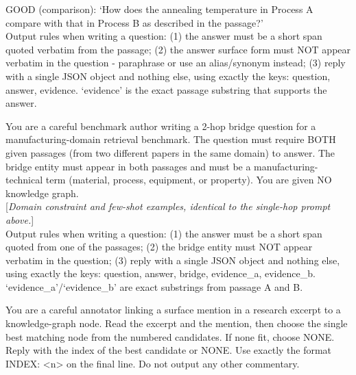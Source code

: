 \documentclass[11pt]{article}
\begin{document}
\begin{tcolorbox}[breakable, colback=gray!3, colframe=gray!55, colbacktitle=black!75, coltitle=white, boxrule=0.6pt, title=\textbf{Released-benchmark single-hop generator system prompt}, fonttitle=\small\bfseries]
\hspace*{1em}GOOD (comparison): `How does the annealing temperature in Process A compare with that in Process B as described in the passage?'\\[4pt]
Output rules when writing a question: (1) the answer must be a short span quoted verbatim from the passage; (2) the answer surface form must NOT appear verbatim in the question - paraphrase or use an alias/synonym instead; (3) reply with a single JSON object and nothing else, using exactly the keys: question, answer, evidence. `evidence' is the exact passage substring that supports the answer.
\end{tcolorbox}

\begin{tcolorbox}[breakable, colback=gray!3, colframe=gray!55, colbacktitle=black!75, coltitle=white, boxrule=0.6pt, title=\textbf{Released-benchmark two-hop bridge generator system prompt}, fonttitle=\small\bfseries]
\footnotesize\raggedright{}
You are a careful benchmark author writing a 2-hop bridge question for a manufacturing-domain retrieval benchmark. The question must require BOTH given passages (from two different papers in the same domain) to answer. The bridge entity must appear in both passages and must be a manufacturing-technical term (material, process, equipment, or property). You are given NO knowledge graph.\\[4pt]
[\textit{Domain constraint and few-shot examples, identical to the single-hop prompt above.}]\\[4pt]
Output rules when writing a question: (1) the answer must be a short span quoted from one of the passages; (2) the bridge entity must NOT appear verbatim in the question; (3) reply with a single JSON object and nothing else, using exactly the keys: question, answer, bridge, evidence\_a, evidence\_b. `evidence\_a'/`evidence\_b' are exact substrings from passage A and B.
\end{tcolorbox}

\begin{tcolorbox}[breakable, colback=gray!3, colframe=gray!55, colbacktitle=black!75, coltitle=white, boxrule=0.6pt, title=\textbf{Released-benchmark single-hop verifier system prompt}, fonttitle=\small\bfseries]
\footnotesize\raggedright{}
You are a careful annotator linking a surface mention in a research excerpt to a knowledge-graph node. Read the excerpt and the mention, then choose the single best matching node from the numbered candidates. If none fit, choose NONE. Reply with the index of the best candidate or NONE. Use exactly the format INDEX: <n> on the final line. Do not output any other commentary.
\end{tcolorbox}
\end{document}
